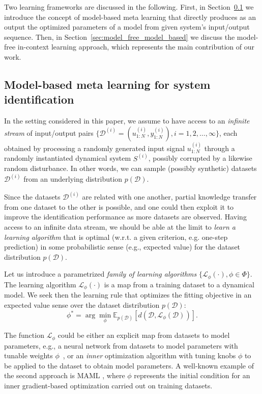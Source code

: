 \documentclass{article}
\newcommand{\sys}{S}
\newcommand{\diss}{d}
\newcommand{\learn}{\mathcal{L}}
\newcommand{\D}{\mathcal{D}}
\newcommand{\E}{\mathbb{E}}
\begin{document}
Two learning frameworks are discussed in the following. First, in Section~\ref{sec:model_based} we introduce the concept of model-based meta learning that directly produces as an output the optimized parameters of a model from  given system's input/output sequence. Then, in Section~\ref{sec:model_free_model_based} we discuss the model-free in-context learning approach, which represents the main contribution of our work. 

\subsection{Model-based meta learning for system identification} \label{sec:model_based}
In the setting considered in  this 
paper, we assume to have access to an \emph{infinite stream} of input/output pairs $\{\D^{(i)} = (u_{1:N}^{(i)}, y_{1:N}^{(i)}), i=1,2,\dots, \infty \}$, each obtained by processing a randomly generated input signal $u_{1:N}^{(i)}$ through a randomly instantiated dynamical system
$\sys^{(i)}$, possibly corrupted by a likewise random disturbance. In other words, we can sample (possibly synthetic) datasets $\D^{(i)}$ from an underlying  distribution $p(\D)$.

Since the datasets $\D^{(i)}$ are related with one another,
partial knowledge transfer from one dataset to the other is possible, and one could then exploit it to  improve the identification performance as more datasets are 
observed. Having access
to an infinite data stream, we should be able at the limit to \emph{learn a learning algorithm} that
is optimal (w.r.t. a given criterion, e.g. one-step prediction)  in some probabilistic sense (e.g., expected value) for the dataset distribution $p(\D)$.



Let us introduce a parametrized \emph{family of 
learning algorithms} $\{\learn_\phi(\cdot), \phi \in \Phi\}$. The learning algorithm $\learn_{\phi}(\cdot)$ is a map 
from a training dataset to a dynamical model.   
%
We seek then the learning rule that optimizes the fitting objective in an expected value sense over the dataset distribution $p(\D)$:
\begin{equation}
	\label{eq:meta_objective_exp_noval}
    \phi^{*} = \arg \min_\phi \E_{p(\D)} \left [\diss\left ( \D, \learn_\phi(\D) \right ) \right ].
\end{equation}



The function $\learn_\phi$ could be either an explicit map from datasets to model parameters, e.g., a neural network  from datasets to model parameters with tunable weights $\phi$~\cite{gordon2018metalearning},
or an \emph{inner} optimization algorithm with tuning knobs $\phi$ to be applied to the dataset to obtain model parameters.  
A well-known example of the second approach is  MAML \cite{finn2017model}, where $\phi$ represents the initial condition for an inner gradient-based optimization carried out on training datasets. 
\end{document}
